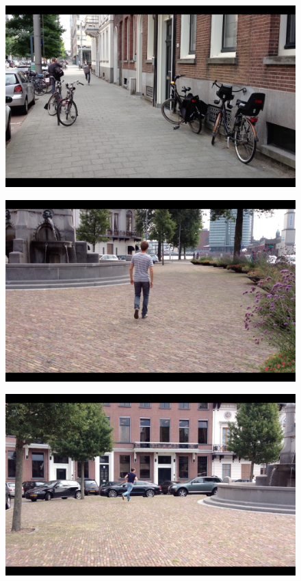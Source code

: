 \begin{figure}
\centering
  \includegraphics[width=1\textwidth]{./Figures/chapter6/data_collection/stills/jos sprint.png}
  \caption[]{}
\end{figure}

\begin{figure}
\centering
  \includegraphics[width=1\textwidth]{./Figures/chapter6/data_collection/stills/jos walking.png}
  \caption[]{}
\end{figure}

\begin{figure}
\centering
  \includegraphics[width=1\textwidth]{./Figures/chapter6/data_collection/stills/roemer run cw.png}
  \caption[]{}
\end{figure}

